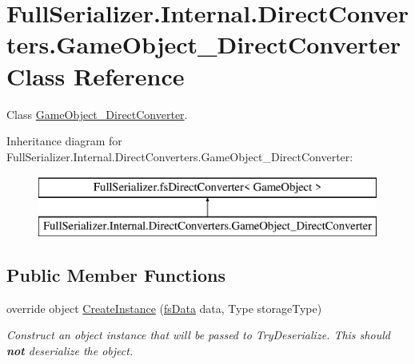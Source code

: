 \hypertarget{class_full_serializer_1_1_internal_1_1_direct_converters_1_1_game_object___direct_converter}{}\section{Full\+Serializer.\+Internal.\+Direct\+Converters.\+Game\+Object\+\_\+\+Direct\+Converter Class Reference}
\label{class_full_serializer_1_1_internal_1_1_direct_converters_1_1_game_object___direct_converter}


Class \hyperlink{class_full_serializer_1_1_internal_1_1_direct_converters_1_1_game_object___direct_converter}{Game\+Object\+\_\+\+Direct\+Converter}.  


Inheritance diagram for Full\+Serializer.\+Internal.\+Direct\+Converters.\+Game\+Object\+\_\+\+Direct\+Converter\+:\begin{figure}[H]
\begin{center}
\leavevmode
\includegraphics[height=2.000000cm]{class_full_serializer_1_1_internal_1_1_direct_converters_1_1_game_object___direct_converter}
\end{center}
\end{figure}
\subsection*{Public Member Functions}
\begin{DoxyCompactItemize}
\item 
override object \hyperlink{class_full_serializer_1_1_internal_1_1_direct_converters_1_1_game_object___direct_converter_a0466ce2803d3ffa8034c849c523d20b7}{Create\+Instance} (\hyperlink{class_full_serializer_1_1fs_data}{fs\+Data} data, Type storage\+Type)
\begin{DoxyCompactList}\small\item\em Construct an object instance that will be passed to Try\+Deserialize. This should {\bfseries not} deserialize the object. \end{DoxyCompactList}\end{DoxyCompactItemize}
